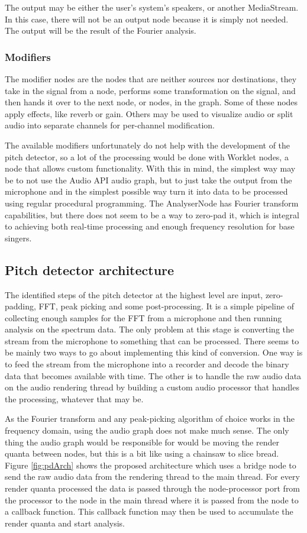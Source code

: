 The output may be either the user's system's speakers, or another MediaStream. In this case, there will not be an output node because it is simply not needed. The output will be the result of the Fourier analysis.

\subsubsection{Modifiers} 
The modifier nodes are the nodes that are neither sources nor destinations, they take in the signal from a node, performs some transformation on the signal, and then hands it over to the next node, or nodes, in the graph. Some of these nodes apply effects, like reverb or gain. Others may be used to visualize audio or split audio into separate channels for per-channel modification.

The available modifiers unfortunately do not help with the development of the pitch detector, so a lot of the processing would be done with Worklet nodes, a node that allows custom functionality. With this in mind, the simplest way may be to not use the Audio API audio graph, but to just take the output from the microphone and in the simplest possible way turn it into data to be processed using regular procedural programming. The AnalyserNode has Fourier transform capabilities, but there does not seem to be a way to zero-pad it, which is integral to achieving both real-time processing and enough frequency resolution for base singers. 

\subsection{Pitch detector architecture}
The identified steps of the pitch detector at the highest level are input, zero-padding, FFT, peak picking and some post-processing. It is a simple pipeline of collecting enough samples for the FFT from a microphone and then running analysis on the spectrum data. The only problem at this stage is converting the stream from the microphone to something that can be processed. There seems to be mainly two ways to go about implementing this kind of conversion. One way is to feed the stream from the microphone into a recorder and decode the binary data that becomes available with time. The other is to handle the raw audio data on the audio rendering thread by building a custom audio processor that handles the processing, whatever that may be. 

As the Fourier transform and any peak-picking algorithm of choice works in the frequency domain, using the audio graph does not make much sense. The only thing the audio graph would be responsible for would be moving the render quanta between nodes, but this is a bit like using a chainsaw to slice bread. Figure \ref{fig:pdArch} shows the proposed architecture which uses a bridge node to send the raw audio data from the rendering thread to the main thread. For every render quanta processed the data is passed through the node-processor port from the processor to the node in the main thread where it is passed from the node to a callback function. This callback function may then be used to accumulate the render quanta and start analysis.

